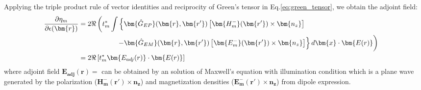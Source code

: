 Applying the triple product rule of vector identities and reciprocity of Green's tensor in Eq.\ref{eq:green_tensor}, we obtain the adjoint field:
\begin{align}\label{eq:deltaDE_adjoint}
    &\begin{split}
        \frac{\partial \eta_m }{\partial \epsilon(\bm{r})} &=  2\Re \left( t_m^\ast  \int \left\{ \bm{\hat{G}_{EP}}(\bm{r},\bm{r'}) \left[\bm{H_{m}^{-}}(\bm{r'}) \times \bm{n_z}\right] \right. \right.\\
        &\left. \phantom{\int}\left. \hspace{1.5cm} - \bm{\hat{G}_{EM}}(\bm{r},\bm{r'}) \left[\bm{E_{m}^{-}}(\bm{r'})\times \bm{n_z}\right] \right\}   d\bm{x} \cdot \bm{E(r)} \right)\\
        &=2\Re\left[t_m^\ast \bm{E_{adj}(r)}  \cdot \bm{E(r)} \right]
    \end{split}
\end{align}
where adjoint field $\mathbf{E_{adj}(r)}=$ can be obtained by an solution of Maxwell's equation with illumination condition which is a plane wave generated by the polarization ($\bm{H_{m}^{-}}(\bm{r'}) \times \bm{n_z}$) and magnetization densities ($\bm{E_{m}^{-}}(\bm{r'})\times \bm{n_z}$) from dipole expression.